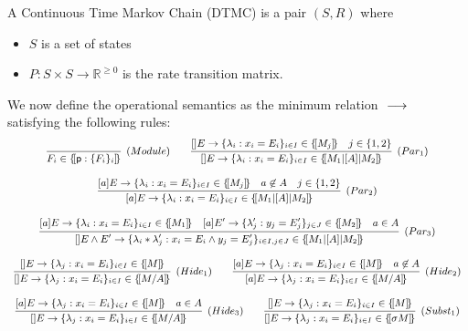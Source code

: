 \begin{definition}
  A Continuous Time Markov Chain (DTMC) is a pair $(S,R)$ where
  \begin{itemize}
  \item $S$ is a set of states
  \item $P: S\times S \rightarrow \mathbb R^{\geq 0}$ is the rate
    transition matrix.
  \end{itemize}
\end{definition}


We now define the operational semantics as the minimum relation
$\ \longrightarrow_{}\ $ satisfying the following rules:
% 
\begin{displaymath}\small
  \begin{array}{ccc}
    \infer[\mathsf{(Module)}]
    {F_i\in\sem{\role{p}:\{F_i\}_i}}
    {}
    \qquad
    \infer[\mathsf{(Par_1)}]
    {\cmd{}E{\lambda_i}{x_i}{E_i}{i\in I}\in \sem{M_1\ppp A M_2}}
    {\cmd{}E{\lambda_i}{x_i}{E_i}{i\in I}\in \sem{M_j}
    & j\in\{1,2\}}
    \\\\
    \infer[\mathsf{(Par_2)}]
    {\cmd aE{\lambda_i}{x_i}{E_i}{i\in I}\in \sem{M_1\ppp A M_2}}
    {\cmd aE{\lambda_i}{x_i}{E_i}{i\in I}\in \sem{M_j}
    & a\not\in A    & j\in\{1,2\}}
    \\\\
    \infer[\mathsf{(Par_3)}]
    {
    [] E\land E' \rightarrow \{\lambda_i * \lambda_j': x_i = E_i \land y_j = E_j' \}_{i\in I, j\in J}
    \in \sem{M_1\ppp A M_2}
    }
    {\cmd aE{\lambda_i}{x_i}{E_i}{i\in I}\in \sem{M_1}{}
    & \cmd a{E'}{\lambda_j'}{y_j}{E_j'}{j\in J}\in \sem{M_2}{}
    & a\in A}
    \\\\
    \infer[\mathsf{(Hide_1)}]
    {
    \cmd {}E{\lambda_j}{x_i}{E_i}{i\in I}\in \sem{M/A}{}
    }
    {
    \cmd {}E{\lambda_j}{x_i}{E_i}{i\in I}\in \sem{M}{}
    }
    \qquad
    \infer[\mathsf{(Hide_2)}]
    {
    \cmd {a}E{\lambda_j}{x_i}{E_i}{i\in I}\in \sem{M/A}{}
    }
    {
    \cmd {a}E{\lambda_j}{x_i}{E_i}{i\in I}\in \sem{M}{}
    & a\not\in A
      }
    \\\\
    \infer[\mathsf{(Hide_3)}]
    {
    \cmd {}E{\lambda_j}{x_i}{E_i}{i\in I}\in \sem{M/A}{}
    }
    {
    \cmd {a}E{\lambda_j}{x_i}{E_i}{i\in I}\in \sem{M}{}
    & a\in A
      }
      \qquad
      \infer[\mathsf{(Subst_1)}]
      {
      \cmd {}E{\lambda_j}{x_i}{E_i}{i\in I}\in \sem{\sigma M}{}
      }
      {
      \cmd {}E{\lambda_j}{x_i}{E_i}{i\in I}\in \sem{M}{}
}
\end{array}
\end{displaymath}
